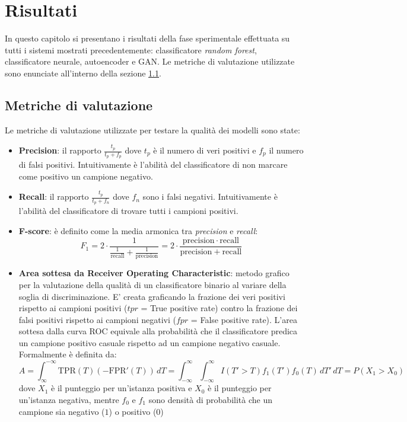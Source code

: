 \chapter{Risultati}
In questo capitolo si presentano i risultati della fase sperimentale effettuata su tutti i sistemi mostrati precedentemente: classificatore \textit{random forest}, classificatore neurale, autoencoder e GAN. Le metriche di valutazione utilizzate sono enunciate all'interno della sezione \ref{metriche}.

\section{Metriche di valutazione}
\label{metriche}
Le metriche di valutazione utilizzate per testare la qualità dei modelli sono state:
\begin{itemize}
\item \textbf{Precision}: il rapporto $\frac{t_p}{t_p+f_p}$ dove $t_p$ è il numero di veri positivi e $f_p$ il numero di falsi positivi. Intuitivamente è l'abilità del classificatore di non marcare come positivo un campione negativo.
\item \textbf{Recall}: il rapporto $\frac{t_p}{t_p+f_n}$  dove $f_n$ sono i falsi negativi. Intuitivamente è l'abilità del classificatore di trovare tutti i campioni positivi.
\item \textbf{F-score}: è definito come la media armonica tra \textit{precision} e \textit{recall}: 
\[F_1 = 2 \cdot \frac{1}{\tfrac{1}{\mathrm{recall}} + \tfrac{1}{\mathrm{precision}}} = 2 \cdot \frac{\mathrm{precision} \cdot \mathrm{recall}}{\mathrm{precision} + \mathrm{recall}}\]
\item \textbf{Area sottesa da Receiver Operating Characteristic}:  metodo grafico per la valutazione della qualità di un classificatore binario al variare della soglia di discriminazione. E' creata graficando la frazione dei veri positivi rispetto ai campioni positivi ($tpr$ = True positive rate) contro la frazione dei falsi positivi rispetto ai campioni negativi ($fpr$ = False positive rate). L'area sottesa dalla curva ROC equivale alla probabilità che il classificatore predica un campione positivo casuale rispetto ad un campione negativo casuale. Formalmente è definita da:
\[ A = \int_{\infty}^{-\infty} \mbox{TPR}(T) \left(-\mbox{FPR}'(T)\right) \, dT = \int_{-\infty}^{\infty} \int_{-\infty}^{\infty} I(T'>T)f_1(T') f_0(T) \, dT' \, dT = P(X_1 > X_0)\]
dove 
$X_{1}$ è il punteggio per un'istanza positiva e $X_{0}$ è il punteggio per un'istanza negativa, mentre $f_{0}$ e $f_{1}$ sono densità di probabilità che un campione sia negativo ($1$) o positivo ($0$)
\end{itemize}

